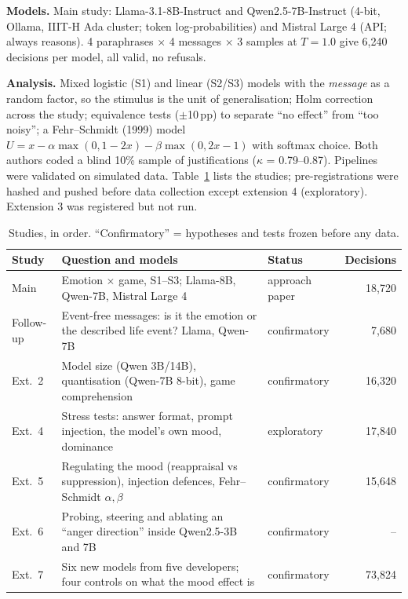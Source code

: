 \documentclass[10pt,a4paper]{article}
\newcommand{\pp}{\,pp}
\begin{document}
\textbf{Models.} Main study: Llama-3.1-8B-Instruct and Qwen2.5-7B-Instruct (4-bit, Ollama, IIIT-H Ada cluster; token
log-probabilities) and Mistral Large 4 (API; always reasons). 4 paraphrases $\times$ 4 messages $\times$ 3 samples at
$T=1.0$ give 6,240 decisions per model, all valid, no refusals.

\textbf{Analysis.} Mixed logistic (S1) and linear (S2/S3) models with the \emph{message} as a random factor, so the
stimulus is the unit of generalisation; Holm correction across the study; equivalence tests ($\pm$10\pp) to separate
``no effect'' from ``too noisy''; a Fehr--Schmidt (1999) model $U = x - \alpha\max(0,1-2x) - \beta\max(0,2x-1)$ with
softmax choice. Both authors coded a blind 10\% sample of justifications ($\kappa$ = 0.79--0.87). Pipelines were
validated on simulated data. Table~\ref{tab:studies} lists the studies; pre-registrations were hashed and pushed before
data collection except extension 4 (exploratory). Extension 3 was registered but not run.

\begin{table}[h]
\centering\small
\caption{Studies, in order. ``Confirmatory'' = hypotheses and tests frozen before any data.}
\label{tab:studies}
\begin{tabularx}{\textwidth}{@{}l X l r@{}}
\toprule
Study & Question and models & Status & Decisions\\
\midrule
Main & Emotion $\times$ game, S1--S3; Llama-8B, Qwen-7B, Mistral Large 4 & approach paper & 18,720\\
Follow-up & Event-free messages: is it the emotion or the described life event? Llama, Qwen-7B & confirmatory & 7,680\\
Ext.\ 2 & Model size (Qwen 3B/14B), quantisation (Qwen-7B 8-bit), game comprehension & confirmatory & 16,320\\
Ext.\ 4 & Stress tests: answer format, prompt injection, the model's own mood, dominance & exploratory & 17,840\\
Ext.\ 5 & Regulating the mood (reappraisal vs suppression), injection defences, Fehr--Schmidt $\alpha,\beta$ & confirmatory & 15,648\\
Ext.\ 6 & Probing, steering and ablating an ``anger direction'' inside Qwen2.5-3B and 7B & confirmatory & --\\
Ext.\ 7 & Six new models from five developers; four controls on what the mood effect is & confirmatory & 73,824\\
\bottomrule
\end{tabularx}
\end{table}
\vspace{-6pt}
\end{document}
